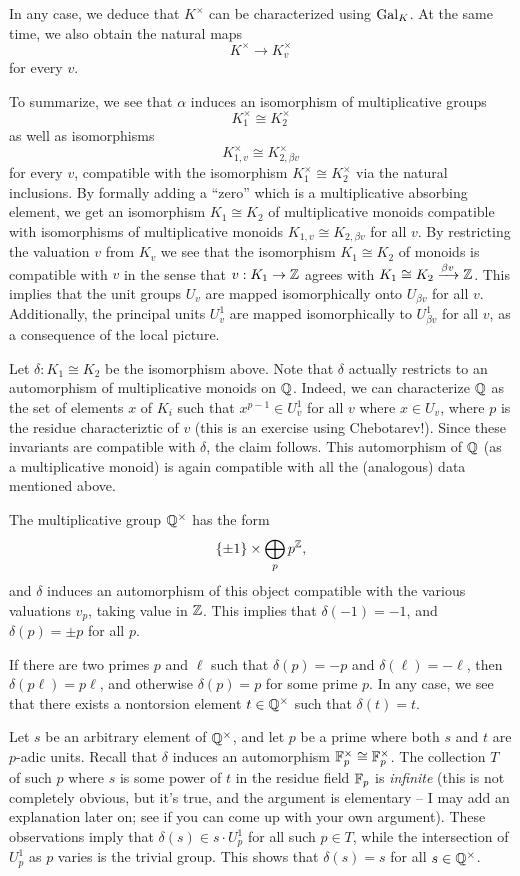 In any case, we deduce that $K^{\times}$ can be characterized using $\operatorname{Gal}_{K}$.
At the same time, we also obtain the natural maps
\[ K^{\times} \to K_{v}^{\times} \]
for every $v$.

To summarize, we see that $\alpha$ induces an isomorphism of multiplicative groups
\[ K_{1}^{\times} \cong K_{2}^{\times} \]
as well as isomorphisms
\[ K_{1,v}^{\times} \cong K_{2,\beta v}^{\times} \]
for every $v$, compatible with the isomorphism $K_{1}^{\times} \cong K_{2}^{\times}$ via the natural inclusions.
By formally adding a ``zero'' which is a multiplicative absorbing element, we get an isomorphism $K_{1} \cong K_{2}$ of multiplicative monoids compatible with isomorphisms of multiplicative monoids $K_{1,v} \cong K_{2,\beta v}$ for all $v$.
By restricting the valuation $v$ from $K_{v}$ we see that the isomorphism $K_{1} \cong K_{2}$ of monoids is compatible with $v$ in the sense that $v : K_{1} \to \mathbb{Z}$ agrees with $K_{1} \cong K_{2} \xrightarrow{\beta v} \mathbb{Z}$.
This implies that the unit groups $U_{v}$ are mapped isomorphically onto $U_{\beta v}$ for all $v$.
Additionally, the principal units $U_{v}^{1}$ are mapped isomorphically to $U_{\beta v}^{1}$ for all $v$, as a consequence of the local picture.

Let $\delta : K_{1} \cong K_{2}$ be the isomorphism above.
Note that $\delta$ actually restricts to an automorphism of multiplicative monoids on $\mathbb{Q}$.
Indeed, we can characterize $\mathbb{Q}$ as the set of elements $x$ of $K_{i}$ such that $x^{p-1} \in U_{v}^{1}$ for all $v$ where $x \in U_{v}$, where $p$ is the residue characteriztic of $v$ (this is an exercise using Chebotarev!).
Since these invariants are compatible with $\delta$, the claim follows.
This automorphism of $\mathbb{Q}$ (as a multiplicative monoid) is again compatible with all the (analogous) data mentioned above.

The multiplicative group $\mathbb{Q}^{\times}$ has the form
\[ \{\pm 1\} \times \bigoplus_{p} p^{\mathbb{Z}}, \]
and $\delta$ induces an automorphism of this object compatible with the various valuations $v_{p}$, taking value in $\mathbb{Z}$.
This implies that $\delta(-1) = -1$, and $\delta(p) = \pm p$ for all $p$.

If there are two primes $p$ and $\ell$ such that $\delta(p) = -p$ and $\delta(\ell) = -\ell$, then $\delta(p\ell) = p\ell$, and otherwise $\delta(p) = p$ for some prime $p$.
In any case, we see that there exists a nontorsion element $t \in \mathbb{Q}^{\times}$ such that $\delta(t) = t$.

Let $s$ be an arbitrary element of $\mathbb{Q}^{\times}$, and let $p$ be a prime where both $s$ and $t$ are $p$-adic units.
Recall that $\delta$ induces an automorphism $\mathbb{F}_{p}^{\times} \cong \mathbb{F}_{p}^{\times}$.
The collection $T$ of such $p$ where $s$ is some power of $t$ in the residue field $\mathbb{F}_{p}$ is \emph{infinite} (this is not completely obvious, but it's true, and the argument is elementary -- I may add an explanation later on; see if you can come up with your own argument).
These observations imply that $\delta(s) \in s \cdot U_{p}^{1}$ for all such $p \in T$, while the intersection of $U_{p}^{1}$ as $p$ varies is the trivial group.
This shows that $\delta(s) = s$ for all $s \in \mathbb{Q}^{\times}$.

